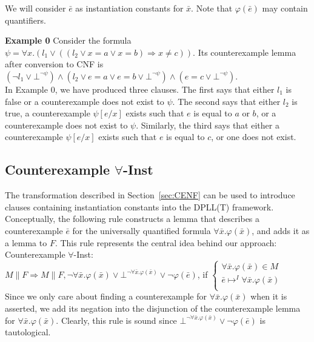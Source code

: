 \documentclass{llncs}
\begin{document}
We will consider $\bar{e}$ as instantiation constants for $\bar{x}$.
Note that $\varphi(\bar{e})$ may contain quantifiers.

{\bf Example 0}
Consider the formula $\psi = \forall x. (l_1 \vee (( l_2 \vee x = a \vee x = b ) \Rightarrow x \neq c))$.
Its counterexample lemma after conversion to CNF is $( \neg l_1 \vee \bot^{\neg \psi}) \wedge ( l_2 \vee e = a \vee e = b \vee \bot^{\neg \psi} ) \wedge ( e = c \vee \bot^{\neg \psi})$. \\

In Example 0, we have produced three clauses.
The first says that either $l_1$ is false or a counterexample does not exist to $\psi$.
The second says that either $l_2$ is true, a counterexample $\psi[e/x]$ exists such that $e$ is equal to $a$ or $b$, or a counterexample does not exist to $\psi$. 
Similarly, the third says that either a counterexample $\psi[e/x]$ exists such that $e$ is equal to $c$, or one does not exist.

\subsection{Counterexample $\forall$-Inst}

The transformation described in Section~\ref{sec:CENF} can be used to introduce clauses containing instantiation constants into the DPLL(T) framework.
Conceptually, the following rule constructs a lemma that describes a counterexample $\bar{e}$ for the universally quantified formula $\forall \bar{x}. \varphi( \bar{ x } )$, and adds it as a lemma to $F$.
This rule represents the central idea behind our approach: \\

\noindent Counterexample $\forall$-Inst: \\

$M \parallel F \Longrightarrow M \parallel F, \neg \forall \bar{x}. \varphi( \bar{x} ) \vee \bot^{\neg \forall \bar{x}. \varphi( \bar{x} )} \vee \neg \varphi( \bar{ e } )$, if   
$\begin{cases}
  \forall \bar{x}. \varphi( \bar{ x } ) \in M \\
  \bar{ e } \mapsto^I \forall \bar{x}. \varphi( \bar{ x } ) \\
\end{cases}$ \\

Since we only care about finding a counterexample for $\forall \bar{x}. \varphi( \bar{x} )$ when it is asserted, we add its negation into the disjunction of the counterexample lemma for $\forall \bar{x}. \varphi( \bar{x} )$.
Clearly, this rule is sound since $\bot^{\neg \forall \bar{x}. \varphi( \bar{x} )} \vee \neg \varphi( \bar{ e } )$ is tautological.
\end{document}
